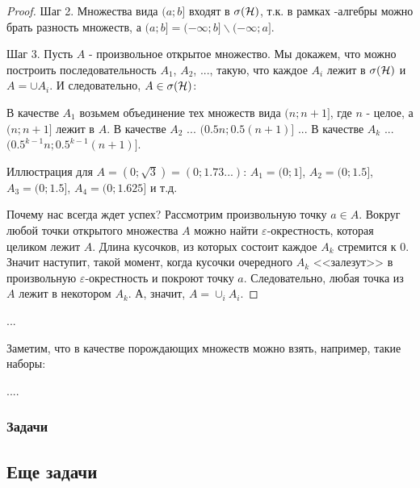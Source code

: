 {\begin{proof}
Шаг 2. Множества вида $(a;b]$ входят в $\sigma(\mathcal{H})$, т.к. в рамках \s-алгебры можно брать разность множеств, а $(a;b]=(-\infty;b]\backslash (-\infty;a]$.

Шаг 3. Пусть $A$ - произвольное открытое множество. Мы докажем, что можно построить последовательность $A_{1}$, $A_{2}$, ..., такую, что каждое $A_{i}$ лежит в $\sigma(\mathcal{H})$ и $A=\cup A_{i}$. И следовательно, $A\in\sigma(\mathcal{H})$:

В качестве $A_{1}$ возьмем объединение тех множеств вида $(n;n+1]$, где $n$ - целое, а $(n;n+1]$ лежит в $A$.
В качестве $A_{2}$ ... $(0.5n;0.5(n+1)]$
...
В качестве $A_{k}$ ... $(0.5^{k-1}n;0.5^{k-1}(n+1)]$.

Иллюстрация для $A=(0;\sqrt{3})=(0;1.73...)$:
$A_{1}=(0;1]$, $A_{2}=(0;1.5]$, $A_{3}=(0;1.5]$, $A_{4}=(0;1.625]$ и т.д.

Почему нас всегда ждет успех? Рассмотрим произвольную точку $a\in A$. Вокруг любой точки открытого множества $A$ можно найти $\varepsilon$-окрестность, которая целиком лежит $A$. Длина кусочков, из которых состоит каждое $A_{k}$ стремится к 0. Значит наступит, такой момент, когда кусочки очередного $A_{k}$ <<залезут>> в произвольную $\varepsilon$-окрестность и покроют точку $a$. Следовательно, любая точка из $A$ лежит в некотором $A_{k}$. А, значит, $A=\cup_{i} A_{i}$.
\end{proof}
...

Заметим, что в качестве порождающих множеств можно взять, например, такие наборы:

....

}
\subsubsection*{Задачи}




\subsection{Еще задачи}



